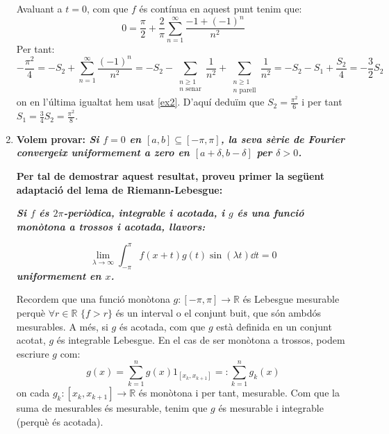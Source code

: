 \documentclass[10pt,a4paper]{article}
\newcommand{\RR}{\ensuremath{\mathbb{R}}} %
\newcommand{\vf}[1]{\boldsymbol{\mathrm{#1}}} %
\theoremstyle{definition}
\begin{document}
\begin{enumerate}
        Avaluant a $t=0$, com que $f$ és contínua en aquest punt tenim que:
        $$0=\frac{\pi}{2}+\frac{2}{\pi}\sum_{n=1}^\infty\frac{-1+{(-1)}^n}{n^2}$$
        Per tant:
        $$-\frac{\pi^2}{4}=-S_2+\sum_{n=1}^{\infty}\frac{{(-1)}^n}{n^2}=-S_2-\sum_{\substack{n\geq 1\\n\text{ senar}}}\frac{1}{n^2}+\sum_{\substack{n\geq 1\\n\text{ parell}}}\frac{1}{n^2}=-S_2-S_1+\frac{S_2}{4}=-\frac{3}{2}S_2$$
        on en l'última igualtat hem usat \eqref{ex2}. D'aquí deduïm que $S_2=\frac{\pi^2}{6}$ i per tant $S_1=\frac{3}{4}S_2=\frac{\pi^2}{8}$.
        \item\textbf{Volem provar: \textit{Si $f=0$ en $[a,b]\subseteq[-\pi,\pi]$, la seva sèrie de Fourier convergeix uniformement a zero en $[a+\delta,b-\delta]$ per $\delta>0$.}}

        \textbf{Per tal de demostrar aquest resultat, proveu primer la següent adaptació del lema de Riemann-Lebesgue:}

        \textbf{\textit{Si $f$ és $2\pi$-periòdica, integrable i acotada, i $g$ és una funció monòtona a trossos i acotada, llavors:}}

        $$\lim_{\lambda\to\infty}\int_{-\pi}^{\pi}f(x+t)g(t)\sin(\lambda t)\dd{t}=0$$
        \textbf{\textit{uniformement en $x$.}}

        Recordem que una funció monòtona $g:[-\pi,\pi]\rightarrow\RR$ és Lebesgue mesurable perquè $\forall r\in\RR$ $\{f>r\}$ és un interval o el conjunt buit, que són ambdós mesurables. A més, si $g$ és acotada, com que $g$ està definida en un conjunt acotat, $g$ és integrable Lebesgue. En el cas de ser monòtona a trossos, podem escriure $g$ com:
        $$g(x)=\sum_{k=1}^ng(x)\vf{1}_{[x_{k},x_{k+1}]}=:\sum_{k=1}^ng_k(x)$$
        on cada $g_k:[x_k,x_{k+1}]\rightarrow\RR$ és monòtona i per tant, mesurable. Com que la suma de mesurables és mesurable, tenim que $g$ és mesurable i integrable (perquè és acotada).


\end{enumerate}
\end{document}
